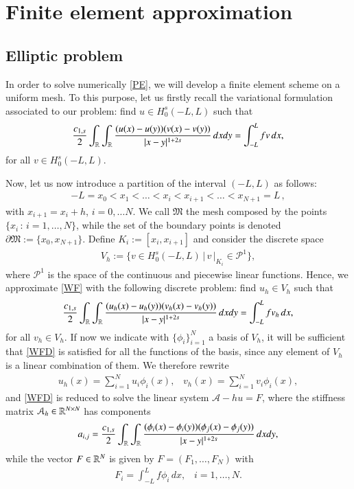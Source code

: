 \section{Finite element approximation}

\subsection{Elliptic problem}

In order to solve numerically \eqref{PE}, we will develop a finite element scheme on a uniform mesh. To this purpose, let us firstly recall the variational formulation associated to our problem: find $u\in H_0^s(-L,L)$ such that
\begin{align}\label{WF}
	\frac{c_{1,s}}{2} \int_{\mathbb{R}}\int_{\mathbb{R}}\frac{(u(x)-u(y))(v(x)-v(y))}{|x-y|^{1+2s}}\,dxdy = \int_{-L}^L fv\,dx,	
\end{align}
for all $v\in H_0^s(-L,L)$. 

\noindent Now, let us now introduce a partition of the interval $(-L,L)$ as follows:
\begin{align*}
	-L = x_0<x_1<\ldots <x_i<x_{i+1}<\ldots<x_{N+1}=L\,,
\end{align*}
with $x_{i+1}=x_i+h$, $i=0,\ldots N$. We call $\mathfrak{M}$ the mesh composed by the points $\{x_i\,:\, i=1,\ldots,N\}$, while the set of the boundary points is denoted $\partial\mathfrak{M}:=\{x_0,x_{N+1}\}$. Define $K_i:=[x_i,x_{i+1}]$ and consider the discrete space 
\begin{align*}
	V_h :=\Big\{v\in H_0^s(-L,L)\,\big|\, \left. v\,\right|_{K_i}\in \mathcal{P}^1\Big\},
\end{align*} 
where $\mathcal{P}^1$ is the space of the continuous and piecewise linear functions. Hence, we approximate \eqref{WF} with the following discrete problem: find $u_h\in V_h$ such that
\begin{align}\label{WFD}
	\frac{c_{1,s}}{2} \int_{\mathbb{R}}\int_{\mathbb{R}}\frac{(u_h(x)-u_h(y))(v_h(x)-v_h(y))}{|x-y|^{1+2s}}\,dxdy = \int_{-L}^L fv_h\,dx,	
\end{align}
for all $v_h\in V_h$. If now we indicate with $\big\{\phi_i\big\}_{i=1}^N$ a basis of $V_h$, it will be sufficient that \eqref{WFD} is satisfied for all the functions of the basis, since any element of $V_h$ is a linear combination of them. We therefore rewrite 
\begin{align*}
	u_h(x) = \sum_{i=1}^N u_i\phi_i(x),\;\;\; v_h(x) = \sum_{i=1}^N v_i\phi_i(x),
\end{align*} 
and \eqref{WFD} is reduced to solve the linear system $\mathcal A-h u=F$, where the stiffness matrix $\mathcal A_h\in \mathbb{R}^{N\times N}$ has components
\begin{align}\label{stiffness}
	a_{i,j}=\frac{c_{1,s}}{2} \int_{\mathbb{R}}\int_{\mathbb{R}}\frac{(\phi_i(x)-\phi_i(y))(\phi_j(x)-\phi_j(y))}{|x-y|^{1+2s}}\,dxdy,	
\end{align}
while the vector $F\in\mathbb{R}^N$ is given by $F=(F_1,\ldots,F_N)$ with
\begin{align*}
	F_i = \int_{-L}^L f\phi_i\,dx,\;\;\; i=1,\ldots,N.
\end{align*}

